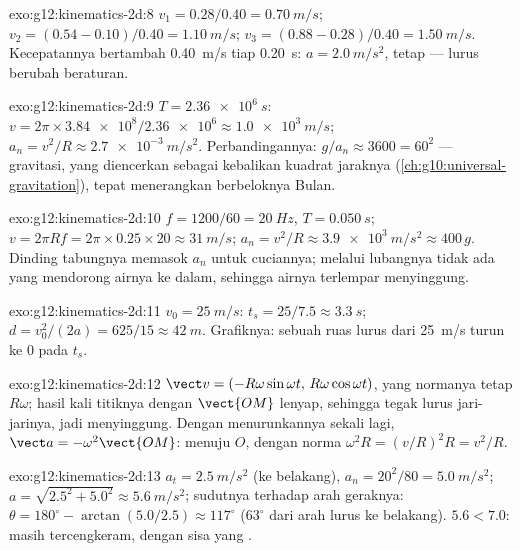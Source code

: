\begin{solution}{exo:g12:kinematics-2d:8}
$v_1 = 0.28/0.40 = \qty{0.70}{m/s}$;
$v_2 = (0.54 - 0.10)/0.40 = \qty{1.10}{m/s}$;
$v_3 = (0.88 - 0.28)/0.40 = \qty{1.50}{m/s}$. Kecepatannya bertambah
\qty{0.40}{m/s} tiap \qty{0.20}{s}: $a = \qty{2.0}{m/s^2}$, tetap ---
lurus berubah beraturan.
\end{solution}

\begin{solution}{exo:g12:kinematics-2d:9}
$T = \qty{2.36e6}{s}$: $v = 2\pi \times \num{3.84e8}/\num{2.36e6}
\approx \qty{1.0e3}{m/s}$;
$a_n = v^2/R \approx \qty{2.7e-3}{m/s^2}$. Perbandingannya:
$g/a_n \approx 3600 = 60^2$ --- gravitasi, yang diencerkan sebagai
kebalikan kuadrat jaraknya (\cref{ch:g10:universal-gravitation}), tepat
menerangkan berbeloknya Bulan.
\end{solution}

\begin{solution}{exo:g12:kinematics-2d:10}
$f = 1200/60 = \qty{20}{Hz}$, $T = \qty{0.050}{s}$;
$v = 2\pi R f = 2\pi \times 0.25 \times 20 \approx \qty{31}{m/s}$;
$a_n = v^2/R \approx \qty{3.9e3}{m/s^2} \approx 400\,g$. Dinding
tabungnya memasok $a_n$ untuk cuciannya; melalui lubangnya tidak ada
yang mendorong airnya ke dalam, sehingga airnya terlempar menyinggung.
\end{solution}

\begin{solution}{exo:g12:kinematics-2d:11}
$v_0 = \qty{25}{m/s}$: $t_s = 25/7.5 \approx \qty{3.3}{s}$;
$d = v_0^2/(2a) = 625/15 \approx \qty{42}{m}$. Grafiknya: sebuah ruas
lurus dari \qty{25}{m/s} turun ke $0$ pada $t_s$.
\end{solution}

\begin{solution}{exo:g12:kinematics-2d:12}
$\vect v = (-R\omega\sin\omega t,\, R\omega\cos\omega t)$, yang
normanya tetap $R\omega$; hasil kali titiknya dengan $\vect{OM}$
lenyap, sehingga tegak lurus jari-jarinya, jadi menyinggung. Dengan
menurunkannya sekali lagi, $\vect a = -\omega^2\vect{OM}$: menuju $O$,
dengan norma $\omega^2 R = (v/R)^2 R = v^2/R$.
\end{solution}

\begin{solution}{exo:g12:kinematics-2d:13}
$a_t = \qty{2.5}{m/s^2}$ (ke belakang), $a_n = 20^2/80 =
\qty{5.0}{m/s^2}$;
$a = \sqrt{2.5^2 + 5.0^2} \approx \qty{5.6}{m/s^2}$; sudutnya terhadap
arah geraknya: $\theta = 180^\circ - \arctan(5.0/2.5) \approx 117^\circ$
($63^\circ$ dari arah lurus ke belakang). $5.6 < 7.0$: masih tercengkeram,
dengan sisa yang .
\end{solution}

